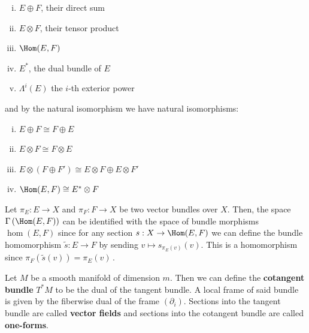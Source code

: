 	\begin{enumerate}[(i)]
		\item $E\oplus F $, their direct sum
		\item $E\otimes F$, their tensor product
		\item $\Hom(E,F)$
		\item $E^*$, the dual bundle of $E$ 
		\item $\Lambda^i(E)$ the $i$-th exterior power
	\end{enumerate} and by the natural isomorphism we have natural isomorphisms: 
	\begin{enumerate}[(i)]
		\item $E\oplus F \cong F\oplus E$
		\item $E\otimes F\cong F \otimes E$
		\item $E\otimes (F\oplus F')\cong E\otimes F \oplus E\otimes F'$
		\item $\Hom(E,F) \cong E^*\otimes F$
	\end{enumerate}
	
	
	\begin{corollary}\label{cor:vb-sectionsIntoHom}
		Let $\pi_E:E\to X$ and $\pi_F:F\to X$ be two vector bundles over $X$.
		 Then, the space $\Gamma \left(\Hom(E,F)\right)$ can be identified with the space of bundle morphisms $\hom(E,F)$ since for any section $s:X\to \Hom(E,F)$ we can define the bundle homomorphism $\tilde{s}:E\to F$ by sending $v\mapsto s_{\pi_E(v)}(v)$. 
		 This is a homomorphism since $\pi_F\left( \tilde{s}(v)\right)=\pi_E(v)$\,. 
	\end{corollary}
	\begin{example}
		Let $M$ be a smooth manifold of dimension $m$. Then we can define the \textbf{cotangent bundle} $T^*M$ to be the dual of the tangent bundle. A local frame of said bundle is given by the fiberwise dual of the frame $(\partial_i) $. Sections into the tangent bundle are called \textbf{vector fields} and sections into the cotangent bundle are called \textbf{one-forms}.  
	\end{example} 
	
